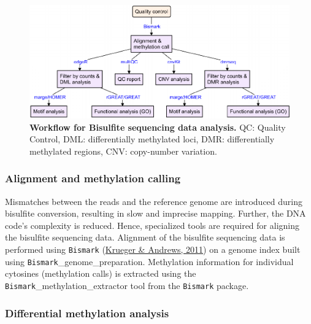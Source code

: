 \documentclass[12pt,twoside]{reedthesis}
\begin{document}
\begin{figure}[H]

{\centering \includegraphics{thesis_files/figure-latex/mf7-1} 

}

\caption[Workflow for Bisulfite sequencing data analysis]{\textbf{Workflow for Bisulfite sequencing data analysis.} QC: Quality Control, DML: differentially methylated loci, DMR: differentially methylated regions, CNV: copy-number variation.}\label{fig:mf7}
\end{figure}
\hypertarget{m3.5.1}{%
\subsubsection*{Alignment and methylation calling}\label{m3.5.1}}

Mismatches between the reads and the reference genome are introduced
during bisulfite conversion, resulting in slow and imprecise mapping.
Further, the DNA code's complexity is reduced. Hence, specialized tools
are required for aligning the bisulfite sequencing data. Alignment of
the bisulfite sequencing data is performed using \texttt{Bismark} (\protect\hyperlink{ref-krueger2011}{Krueger \& Andrews, 2011})
on a genome index built using \texttt{Bismark}\_genome\_preparation. Methylation
information for individual cytosines (methylation calls) is extracted
using the \texttt{Bismark}\_methylation\_extractor tool from the \texttt{Bismark} package.

\hypertarget{m3.5.2}{%
\subsubsection*{Differential methylation analysis}\label{m3.5.2}}
\end{document}
